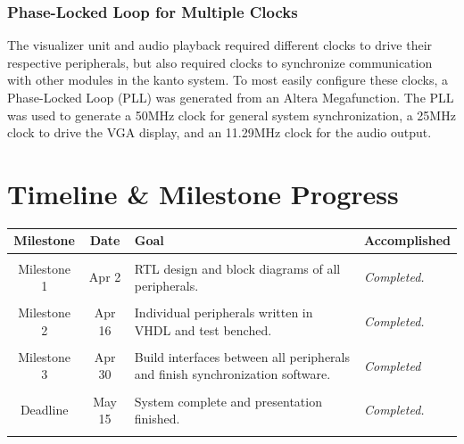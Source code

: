 \documentclass{article}
\begin{document}
\subsubsection{Phase-Locked Loop for Multiple Clocks}
The visualizer unit and audio playback required different clocks to drive their respective peripherals, but also required clocks to synchronize communication with other modules in the kanto system. To most easily configure these clocks, a Phase-Locked Loop (PLL) was generated from an Altera Megafunction. The PLL was used to generate a 50MHz clock for general system synchronization, a 25MHz clock to drive the VGA display, and an 11.29MHz clock for the audio output.

\section{Timeline \& Milestone Progress}
\begin{tabular}{cc|p{7cm}p{3cm}}
\textbf{Milestone} & \textbf{Date} & \textbf{Goal} & \textbf{Accomplished}\\ \hline
&&&\\
Milestone 1 & Apr 2 & RTL design and block diagrams of all peripherals.&
	\textit{Completed.}\\
&&&\\
Milestone 2 & Apr 16 & Individual peripherals written in VHDL and test benched.&
	\textit{Completed.}\\
&&&\\
Milestone 3 & Apr 30 & Build interfaces between all peripherals and finish synchronization software. &
	\textit{Completed}\\
&&&\\
Deadline&May 15&System complete and presentation finished.&\textit{Completed.}\\
&&&\\
\end{tabular}
\end{document}
